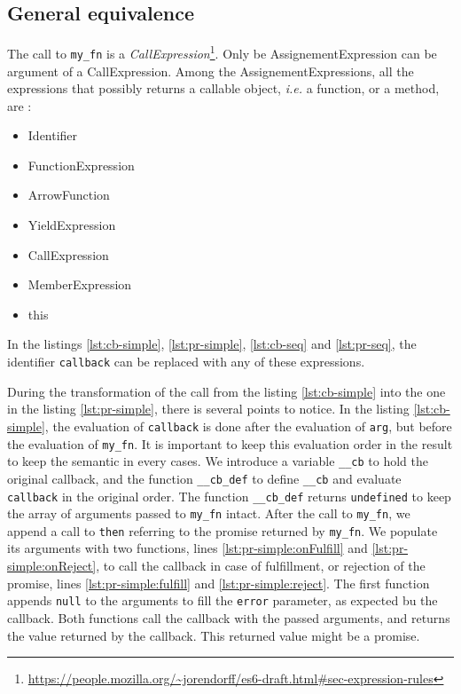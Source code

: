 
\subsection{General equivalence} \label{section:general}

The call to \texttt{my_fn} is a \textit{CallExpression}\footnote{\url{https://people.mozilla.org/~jorendorff/es6-draft.html\#sec-expression-rules}}.
Only be AssignementExpression can be argument of a CallExpression.
Among the AssignementExpressions, all the expressions that possibly returns a callable object, \textit{i.e.} a function, or a method, are :
\begin{itemize}
\item Identifier
\item FunctionExpression
\item ArrowFunction
\item YieldExpression
\item CallExpression
\item MemberExpression
\item this
\end{itemize}
In the listings \ref{lst:cb-simple}, \ref{lst:pr-simple}, \ref{lst:cb-seq} and \ref{lst:pr-seq}, the identifier \texttt{callback} can be replaced with any of these expressions.

During the transformation of the call from the listing \ref{lst:cb-simple} into the one in the listing \ref{lst:pr-simple}, there is several points to notice.
In the listing \ref{lst:cb-simple}, the evaluation of \texttt{callback} is done after the evaluation of \texttt{arg}, but before the evaluation of \texttt{my_fn}.
It is important to keep this evaluation order in the result to keep the semantic in every cases.
We introduce a variable \texttt{__cb} to hold the original callback, and the function \texttt{__cb_def} to define \texttt{__cb} and evaluate \texttt{callback} in the original order.
The function \texttt{__cb_def} returns \texttt{undefined} to keep the array of arguments passed to \texttt{my_fn} intact.
After the call to \texttt{my_fn}, we append a call to \texttt{then} referring to the promise returned by \texttt{my_fn}.
We populate its arguments with two functions, lines \ref{lst:pr-simple:onFulfill} and \ref{lst:pr-simple:onReject}, to call the callback in case of fulfillment, or rejection of the promise, lines \ref{lst:pr-simple:fulfill} and \ref{lst:pr-simple:reject}.
The first function appends \texttt{null} to the arguments to fill the \texttt{error} parameter, as expected bu the callback.
Both functions call the callback with the passed arguments, and returns the value returned by the callback.
This returned value might be a promise.

